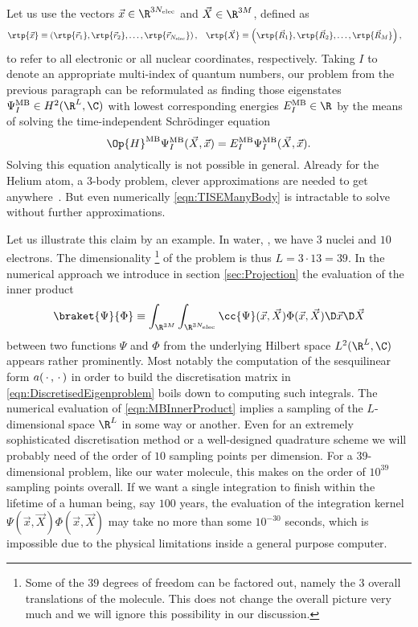 Let us use the vectors $\vec{x} \in \R^{3\Nelec}$ and $\vec{X} \in \R^{3M}$, defined as
\begin{align}
	\rtp{\vec{x}} &\equiv \left(\rtp{\vec{r}_1}, \rtp{\vec{r}_2}, \ldots, \rtp{\vec{r}_{\Nelec}}\right),
	&
	\rtp{\vec{X}} &\equiv \left(\rtp{\vec{R}_1}, \rtp{\vec{R}_2}, \ldots, \rtp{\vec{R}_{M}}\right),
	\label{eqn:DefAllCoords}
\end{align}
to refer to all electronic or all nuclear coordinates, respectively.
Taking $I$ to denote an appropriate multi-index of quantum numbers,
our problem from the previous paragraph can be reformulated
as finding those eigenstates $\Psi^\text{MB}_I \in H^2(\R^L, \C)$
with lowest corresponding energies $E^\text{MB}_I \in \R$
by the means of solving the time-independent Schrödinger equation
\begin{equation}
	\Op{H}^\text{MB} \Psi_I^\text{MB}(\vec{X}, \vec{x})
	= E_I^\text{MB} \Psi_I^\text{MB}(\vec{X}, \vec{x}).
	\label{eqn:TISEManyBody}
\end{equation}
Solving this equation analytically is not possible in general.
Already for the Helium atom, a 3-body problem, clever approximations are needed
to get anywhere~\cite{Hylleraas1929}.
But even numerically \eqref{eqn:TISEManyBody} is intractable to solve
without further approximations.

Let us illustrate this claim by an example.
In water, , we have $3$ nuclei and $10$ electrons.
The dimensionality%
\footnote{Some of the $39$ degrees of freedom can be factored out,
namely the $3$ overall translations of the molecule.
This does not change the overall picture very much and we will ignore
this possibility in our discussion.}
of the problem is thus $L = 3 \cdot 13 = 39$.
In the numerical approach we introduce in section \vref{sec:Projection}
the evaluation of the inner product
\begin{equation}
	\braket{\Psi}{\Phi} \equiv \int_{\R^{3M}} \int_{\R^{3\Nelec}}
		\cc{\Psi}(\vec{x}, \vec{X}) \Phi(\vec{x}, \vec{X})
	\D \vec{x} \D \vec{X}
	\label{eqn:MBInnerProduct}
\end{equation}
between two functions $\Psi$ and $\Phi$ from the
underlying Hilbert space $L^2(\R^L, \C)$ appears rather prominently.
Most notably the computation of the sesquilinear form $a(\,\cdot\,,\,\cdot\,)$
in order to build the discretisation matrix in \eqref{eqn:DiscretisedEigenproblem}
boils down to computing such integrals.
The numerical evaluation of \eqref{eqn:MBInnerProduct}
implies a sampling of the $L$-dimensional space $\R^L$ in some way or another.
Even for an extremely sophisticated discretisation method
or a well-designed quadrature scheme we will probably need of the order of
$10$ sampling points per dimension.
For a 39-dimensional problem, like our water molecule,
this makes on the order of $10^{39}$ sampling points overall.
If we want a single integration to finish within the lifetime of a human being,
say $100$ years,
the evaluation of the
integration kernel $\Psi(\vec{x}, \vec{X}) \Phi(\vec{x}, \vec{X})$
may take no more than some $10^{-30}$ seconds,
which is impossible due to the physical limitations inside a general purpose computer.


